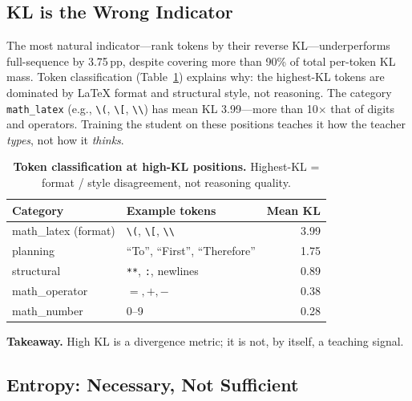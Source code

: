 \documentclass[10pt]{article}
\begin{document}
\subsection{KL is the Wrong Indicator}
\label{sec:kl_paradox}

The most natural indicator---rank tokens by their reverse KL---underperforms full-sequence by 3.75\,pp, despite covering more than 90\% of total per-token KL mass. Token classification (Table~\ref{tab:token_class_main}) explains why: the highest-KL tokens are dominated by LaTeX format and structural style, not reasoning. The category \texttt{math\_latex} (e.g., \texttt{\textbackslash(}, \texttt{\textbackslash[}, \texttt{\textbackslash\textbackslash}) has mean KL 3.99---more than 10$\times$ that of digits and operators. Training the student on these positions teaches it how the teacher \emph{types}, not how it \emph{thinks}.

\begin{table}[h]
\centering
\caption{\textbf{Token classification at high-KL positions.} Highest-KL = format / style disagreement, not reasoning quality.}
\label{tab:token_class_main}
\small
\begin{tabular}{@{}llr@{}}
\toprule
\textbf{Category} & \textbf{Example tokens} & \textbf{Mean KL} \\
\midrule
math\_latex (format)     & \texttt{\textbackslash(}, \texttt{\textbackslash[}, \texttt{\textbackslash\textbackslash} & 3.99 \\
planning                 & ``To'', ``First'', ``Therefore''                                                  & 1.75 \\
structural               & \texttt{**}, \texttt{:}, newlines                                                  & 0.89 \\
math\_operator           & $=, +, -$                                                                         & 0.38 \\
math\_number             & 0--9                                                                              & 0.28 \\
\bottomrule
\end{tabular}
\end{table}

\textbf{Takeaway.} High KL is a divergence metric; it is not, by itself, a teaching signal.

\subsection{Entropy: Necessary, Not Sufficient}
\label{sec:entropy}
\end{document}
